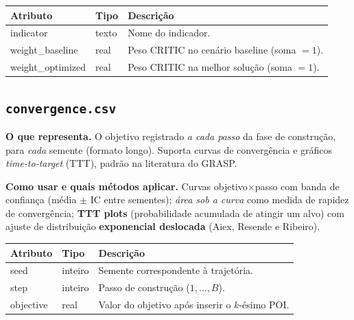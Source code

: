 \documentclass[11pt,a4paper]{article}
\begin{document}
\begin{center}\small
\begin{tabular}{@{}>{\ttfamily}l l p{8.0cm}@{}}
\toprule
\normalfont Atributo & \normalfont Tipo & \normalfont Descrição \\
\midrule
indicator        & texto & Nome do indicador. \\
weight\_baseline & real  & Peso CRITIC no cenário baseline (soma $=1$). \\
weight\_optimized& real  & Peso CRITIC na melhor solução (soma $=1$). \\
\bottomrule
\end{tabular}
\end{center}

\subsection{\texttt{convergence.csv}}

\textbf{O que representa.} O objetivo registrado \emph{a cada passo} da fase de
construção, para \emph{cada} semente (formato longo). Suporta curvas de
convergência e gráficos \emph{time-to-target} (TTT), padrão na literatura do GRASP.

\textbf{Como usar e quais métodos aplicar.} Curvas objetivo$\times$passo com
banda de confiança (média $\pm$ IC entre sementes); \emph{área sob a curva} como
medida de rapidez de convergência; \textbf{TTT plots} (probabilidade acumulada de
atingir um alvo) com ajuste de distribuição \textbf{exponencial deslocada}
(Aiex, Resende e Ribeiro).

\begin{center}\small
\begin{tabular}{@{}>{\ttfamily}l l p{8.0cm}@{}}
\toprule
\normalfont Atributo & \normalfont Tipo & \normalfont Descrição \\
\midrule
seed      & inteiro & Semente correspondente à trajetória. \\
step      & inteiro & Passo de construção ($1,\dots,B$). \\
objective & real    & Valor do objetivo após inserir o $k$-ésimo POI. \\
\bottomrule
\end{tabular}
\end{center}

\end{document}
